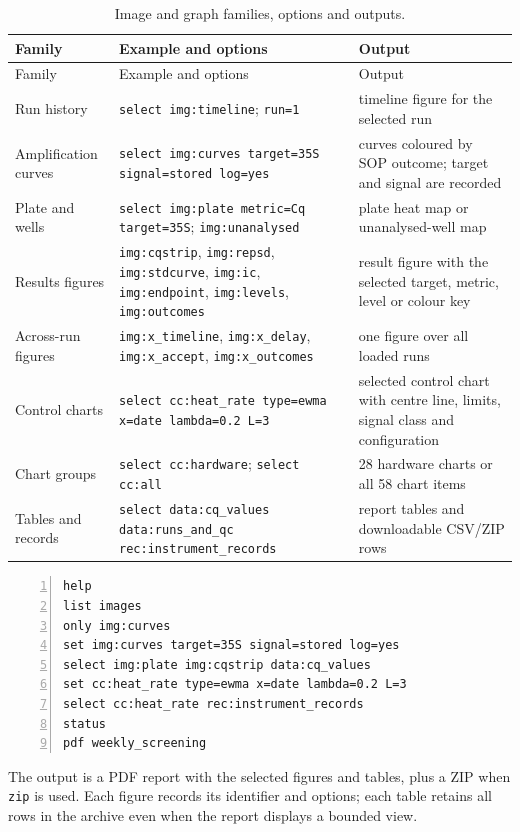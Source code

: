 \begin{xltabular}{\linewidth}{|X|X|X|}
\caption{Image and graph families, options and outputs.}\label{tab:mode-image-options}\\
\toprule Family & Example and options & Output\\\hline\endfirsthead
\toprule Family & Example and options & Output\\\hline\endhead
Run history & \texttt{select img:timeline}; \texttt{run=1} & timeline figure for the selected run\\\hline
Amplification curves & \texttt{select img:curves target=35S signal=stored log=yes} & curves coloured by SOP outcome; target and signal are recorded\\\hline
Plate and wells & \texttt{select img:plate metric=Cq target=35S}; \texttt{img:unanalysed} & plate heat map or unanalysed-well map\\\hline
Results figures & \texttt{img:cqstrip}, \texttt{img:repsd}, \texttt{img:stdcurve}, \texttt{img:ic}, \texttt{img:endpoint}, \texttt{img:levels}, \texttt{img:outcomes} & result figure with the selected target, metric, level or colour key\\\hline
Across-run figures & \texttt{img:x\_timeline}, \texttt{img:x\_delay}, \texttt{img:x\_accept}, \texttt{img:x\_outcomes} & one figure over all loaded runs\\\hline
Control charts & \texttt{select cc:heat\_rate type=ewma x=date lambda=0.2 L=3} & selected control chart with centre line, limits, signal class and configuration\\\hline
Chart groups & \texttt{select cc:hardware}; \texttt{select cc:all} & 28 hardware charts or all 58 chart items\\\hline
Tables and records & \texttt{select data:cq\_values data:runs\_and\_qc rec:instrument\_records} & report tables and downloadable CSV/ZIP rows\\\hline
\bottomrule
\end{xltabular}

\begin{lstlisting}[style=vstyle,language=text,numbers=left,firstnumber=1]
help
list images
only img:curves
set img:curves target=35S signal=stored log=yes
select img:plate img:cqstrip data:cq_values
set cc:heat_rate type=ewma x=date lambda=0.2 L=3
select cc:heat_rate rec:instrument_records
status
pdf weekly_screening
\end{lstlisting}

The output is a PDF report with the selected figures and tables, plus a ZIP when \texttt{zip} is used. Each figure records its identifier and options; each table retains all rows in the archive even when the report displays a bounded view.

